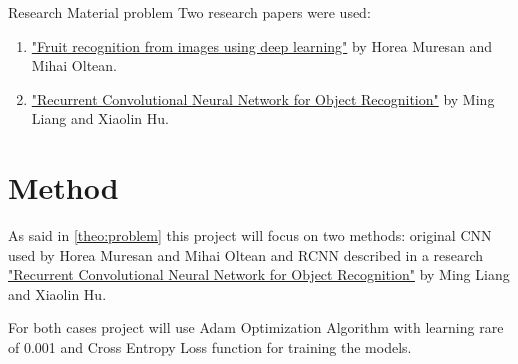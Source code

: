 \documentclass[article,11pt]{article}
\begin{document}
\begin{definition}{{\small Research Material }}{problem}
    Two research papers were used:
    \begin{enumerate}
        \item \href{https://www.researchgate.net/publication/321475443_Fruit_recognition_from_images_using_deep_learning}{"Fruit recognition from images using deep learning"} by Horea Muresan and Mihai Oltean.
        \item \href{https://www.cv-foundation.org/openaccess/content_cvpr_2015/app/2B_004.pdf}{"Recurrent Convolutional Neural Network for Object Recognition"} by Ming Liang and Xiaolin Hu.
      \end{enumerate}
\end{definition}


\newpage
\section{Method}\label{method}
As said in \cref{theo:problem} this project will focus on two methods: 
original CNN used by Horea Muresan and Mihai Oltean and RCNN described in a research 
\href{https://www.cv-foundation.org/openaccess/content_cvpr_2015/app/2B_004.pdf}{"Recurrent Convolutional Neural Network for Object Recognition"}
by Ming Liang and Xiaolin Hu.

For both cases project will use Adam Optimization Algorithm with learning rare of 0.001
and Cross Entropy Loss function for training the models.\\
\end{document}
